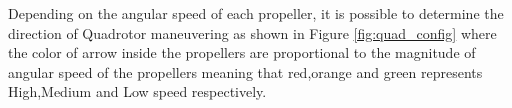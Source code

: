 


Depending on the angular speed of each propeller, it is possible to determine the direction of Quadrotor maneuvering as shown in Figure \ref{fig:quad_config} where the color of arrow inside the propellers are proportional to the magnitude of angular speed of the propellers meaning that red,orange and green represents High,Medium and Low speed respectively.




